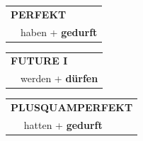 \documentclass[10pt,a4paper]{revtex4-2}
\begin{document}
\begin{verbbox-modal}
    \vspace{10pt}
 
    \begin{tabular}{rl}
     \multicolumn{2}{l}{\textbf{PERFEKT}}\\
   & haben + \textbf{gedurft}\\
  \end{tabular}
\hfill
   \begin{tabular}{rl}
   
    \multicolumn{2}{l}{\textbf{FUTURE I} }\\
    &werden + \textbf{dürfen}\\
 
  \end{tabular}
\hfill
   \begin{tabular}{rl}
      \multicolumn{2}{l}{\textbf{PLUSQUAMPERFEKT}}\\
   & hatten + \textbf{gedurft}\\
  \end{tabular}
  
  \vspace{-5pt}


\end{verbbox-modal}
\end{document}
